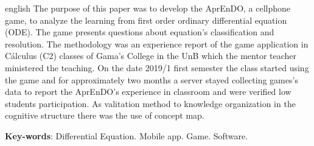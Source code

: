 \begin{resumo}[Abstract]
 \begin{otherlanguage*}{english}     
The purpose of this paper was to develop the AprEnDO, a cellphone game, to analyze the learning from first order ordinary differential equation (ODE). The game presents questions about equation's classification and resolution. The methodology was an experience report of the game application in Cálculus (C2) classes of Gama's College in the UnB which the mentor teacher ministered the teaching. On the date 2019/1 first semester the class started using the game and for approximately two months a server stayed collecting games's data to report the AprEnDO's experience in classroom and were verified low students participation. As valitation method to knowledge organization in the cognitive structure there was the use of concept map. 

      
   \vspace{\onelineskip}
 
   \noindent 
   \textbf{Key-words}: Differential Equation. Mobile app. Game. Software.
 \end{otherlanguage*}
\end{resumo}
